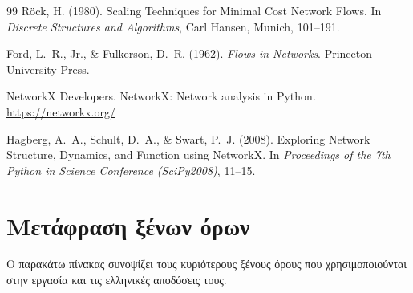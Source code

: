 \documentclass[11pt,a4paper,oneside]{report}
\begin{document}
\begin{thebibliography}{99}
Röck, H. (1980). Scaling Techniques for Minimal Cost Network Flows. In \textit{Discrete Structures and Algorithms}, Carl Hansen, Munich, 101--191.

Ford, L.~R., Jr., \& Fulkerson, D.~R. (1962). \textit{Flows in Networks}. Princeton University Press.

NetworkX Developers. NetworkX: Network analysis in Python. \url{https://networkx.org/}

Hagberg, A.~A., Schult, D.~A., \& Swart, P.~J. (2008). Exploring Network Structure, Dynamics, and Function using NetworkX. In \textit{Proceedings of the 7th Python in Science Conference (SciPy2008)}, 11--15.

\end{thebibliography}


\appendix
\chapter{Μετάφραση ξένων όρων}

Ο παρακάτω πίνακας συνοψίζει τους κυριότερους ξένους όρους που χρησιμοποιούνται στην εργασία και τις ελληνικές αποδόσεις τους.
\end{document}
